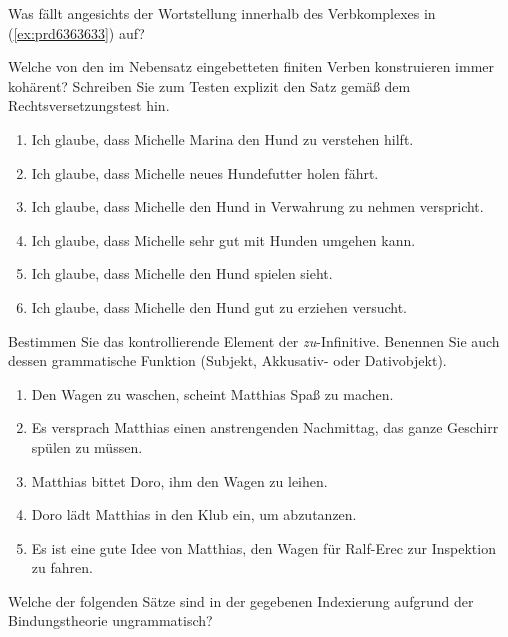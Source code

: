 \Uebung[\tristar] \label{u136a} Was fällt angesichts der Wortstellung innerhalb des Verbkomplexes in (\ref{ex:prd6363633}) auf?

\begin{exe}
\end{exe}

\Uebung \label{u137} Welche von den im Nebensatz eingebetteten finiten Verben konstruieren immer kohärent?
Schreiben Sie zum Testen explizit den Satz gemäß dem Rechtsversetzungstest hin.

\begin{enumerate}\Lf
  \item Ich glaube, dass Michelle Marina den Hund zu verstehen hilft.
  \item Ich glaube, dass Michelle neues Hundefutter holen fährt.
  \item Ich glaube, dass Michelle den Hund in Verwahrung zu nehmen verspricht.
  \item Ich glaube, dass Michelle sehr gut mit Hunden umgehen kann.
  \item Ich glaube, dass Michelle den Hund spielen sieht.
  \item Ich glaube, dass Michelle den Hund gut zu erziehen versucht.
\end{enumerate}

\Uebung \label{u138} Bestimmen Sie das kontrollierende Element der \textit{zu}-Infinitive.
Benennen Sie auch dessen grammatische Funktion (Subjekt, Akkusativ- oder Dativobjekt).

\begin{enumerate}\Lf
  \item Den Wagen zu waschen, scheint Matthias Spaß zu machen.
  \item Es versprach Matthias einen anstrengenden Nachmittag, das ganze Geschirr spülen zu müssen.
  \item Matthias bittet Doro, ihm den Wagen zu leihen.
  \item Doro lädt Matthias in den Klub ein, um abzutanzen.
  \item Es ist eine gute Idee von Matthias, den Wagen für Ralf-Erec zur Inspektion zu fahren.
\end{enumerate}

\Uebung \label{u139} Welche der folgenden Sätze sind in der gegebenen Indexierung aufgrund der Bindungstheorie ungrammatisch?

